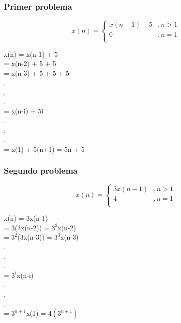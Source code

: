 \documentclass[12pt,twoside]{article}
\begin{document}
\subsubsection{Primer problema}
\begin{equation}
  x(n) =
    \begin{cases}
      x(n-1) + 5&, n>1\\
      0 &, n=1\\
    \end{cases}
\end{equation}
\begin{center}
    x(n) = x(n-1) + 5 \\
     = x(n-2) + 5 + 5\\
     = x(n-3) + 5 + 5 + 5\\.\\.\\.\\
     = x(n-i) + 5i\\.\\.\\.\\
     = x(1) + 5(n+1) = 5n + 5
\end{center}
\subsubsection{Segundo problema}
\begin{equation}
  x(n) =
    \begin{cases}
      3x(n-1) &, n>1\\
      4 &, n=1\\
    \end{cases}
\end{equation}
\begin{center}
    x(n) = 3x(n-1) \\
         = 3(3x(n-2)) = $3^2$x(n-2) \\
         = $3^2$(3x(n-3)) = $3^3$x(n-3) \\.\\.\\.\\
         = $3^i$x(n-i) \\.\\.\\.\\
         = $3^{n+1}$x(1) = $4(3^{n+1})$
\end{center}
\end{document}
